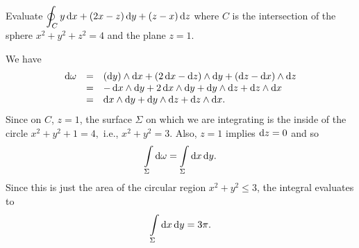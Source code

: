\begin{exa}
Evaluate $\doint _C y\d{x}+ (2x - z)\d{y} + (z - x)\d{z} $ where $C$
is the intersection of the sphere $x^2 + y^2 + z^2 = 4$ and the
plane $z = 1$.
\end{exa}
\begin{solu} We have
$$\begin{array}{lll}
\d{\omega}  & = & (\d{y})\wedge \d{x}+ (2\d{x}- \d{z} )\wedge \d{y}
+ (\d{z} - \d{x})\wedge \d{z}
\\
& = & -\d{x}\wedge \d{y} + 2\d{x}\wedge \d{y} + \d{y} \wedge \d{z} + \d{z} \wedge \d{x}\\
& = & \d{x}\wedge \d{y} + \d{y} \wedge \d{z} + \d{z} \wedge \d{x}.\\
\end{array}$$
Since on $C$, $z = 1$, the surface $\Sigma$ on which we are
integrating is the inside of the circle $x^2 + y^2 + 1 = 4,$ i.e.,
$x^2 + y^2 = 3.$ Also, $z = 1 $ implies $\d{z} = 0$ and so
$$\dint \limits_\Sigma \d{\omega} = \dint \limits_\Sigma \d{x} \d{y}.$$Since this is just the area of the circular region $x^2 +
y^2 \leq 3$, the integral evaluates to
$$ \dint \limits_\Sigma \d{x} \d{y} = 3\pi.$$
\end{solu}


